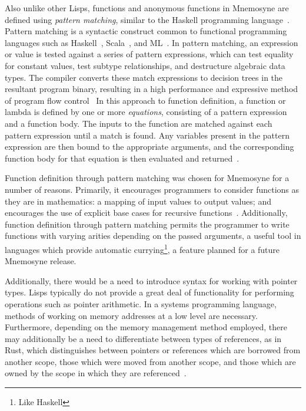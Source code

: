 \documentclass[11pt,a4paper]{article}
\theoremstyle{break}
\begin{document}
Also unlike other Lisps, functions and anonymous functions in Mnemosyne are defined using \textit{pattern matching}, similar to the Haskell programming language~\cite{jones2003haskell,hudak1992gentle,hudak1992report}. Pattern matching is a syntactic construct common to functional programming languages such as Haskell~\cite{jones2003haskell,hudak1992report,hudak1992gentle}, Scala~\cite{odersky2004scala,odersky2004overview}, and ML~\cite{maranget2008compiling,Krishnaswami:2009:FPM:1594834.1480927}. In pattern matching, an expression or value is tested against a series of pattern expressions, which can test equality for constant values, test subtype relationships, and destructure algebraic data types. The compiler converts these match expressions to decision trees in the resultant program binary, resulting in a high performance and expressive method of program flow control~\cite{maranget2007warnings,Krishnaswami:2009:FPM:1594834.1480927,syme2007extensible,maranget2008compiling} In this approach to function definition, a function or lambda is defined by one or more \textit{equations}, consisting of a pattern expression and a function body. The inputs to the function are matched against each pattern expression until a match is found. Any variables present in the pattern expression are then bound to the appropriate arguments, and the corresponding function body for that equation is then evaluated and returned~\cite{jones2003haskell,hudak1992report}.

Function definition through pattern matching was chosen for Mnemosyne for a number of reasons. Primarily, it encourages programmers to consider functions as they are in mathematics: a mapping of input values to output values; and encourages the use of explicit base cases for recursive functions~\cite{hudak1992gentle}. Additionally, function definition through pattern matching permits the programmer to write functions with varying arities depending on the passed arguments, a useful tool in languages which provide automatic currying\footnote{Like Haskell}, a feature planned for a future Mnemosyne release.

Additionally, there would be a need to introduce syntax for working with pointer types. Lisps typically do not provide a great deal of functionality for performing operations such as pointer arithmetic. In a systems programming language, methods of working on memory addresses at a low level are necessary. Furthermore, depending on the memory management method employed, there may additionally be a need to differentiate between types of references, as in Rust, which distinguishes between pointers or references which are borrowed from another scope, those which were moved from another scope, and those which are owned by the scope in which they are referenced~\cite{Matsakis:2014:RL:2663171.2663188}.
\end{document}
